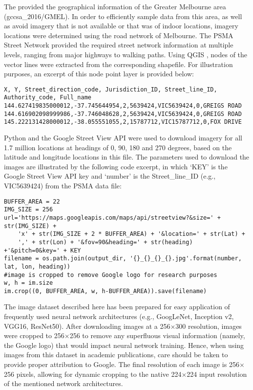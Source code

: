 \documentclass[final,3p,times,authoryear]{elsarticle}
\begin{document}
The \citet{Aurin2018} provided the geographical information of the Greater Melbourne area (gccsa\_2016/GMEL). In order to efficiently sample data from this area, as well as avoid imagery that is not available or that was of indoor locations, imagery locations were determined using the road network of Melbourne. The PSMA Street Network \citep{PSMA2018} provided the required street network information at multiple levels, ranging from major highways to walking paths. Using QGIS \citep{QGIS2009}, nodes of the vector lines were extracted from the corresponding shapefile. For illustration purposes, an excerpt of this node point layer is provided below:

\begin{verbatim}
X, Y, Street_direction_code, Jurisdiction_ID, Street_line_ID, Authority_code, Full_name
144.627419835000012,-37.745644954,2,5639424,VIC5639424,0,GREIGS ROAD
144.616902098999986,-37.746048628,2,5639424,VIC5639424,0,GREIGS ROAD
145.222131428000012,-38.055551055,2,15787712,VIC15787712,0,FOX DRIVE
\end{verbatim}

Python and the Google Street View API \citep{GoogleMaps2017b} were used to download imagery for all 1.7 million locations at headings of 0, 90, 180 and 270 degrees, based on the latitude and longitude locations in this file. The parameters used to download the images are illustrated by the following code excerpt, in which `KEY' is the Google Street View API key and `number' is the Street\_line\_ID (e.g., VIC5639424) from the PSMA data file:

\begin{verbatim}
BUFFER_AREA = 22
IMG_SIZE = 256
url='https://maps.googleapis.com/maps/api/streetview?&size=' + str(IMG_SIZE) +
    'x' + str(IMG_SIZE + 2 * BUFFER_AREA) + '&location=' + str(Lat) +
    ',' + str(Lon) + '&fov=90&heading=' + str(heading) +'&pitch=0&key=' + KEY         
filename = os.path.join(output_dir, '{}_{}_{}_{}.jpg'.format(number, lat, lon, heading))
#image is cropped to remove Google logo for research purposes
w, h = im.size
im.crop((0, BUFFER_AREA, w, h-BUFFER_AREA)).save(filename)
\end{verbatim}

The image dataset described here has been prepared for easy application of frequently used neural network architectures (e.g., GoogLeNet, Inception v2, VGG16, ResNet50). After downloading images at a 256$\times$300 resolution, images were cropped to 256$\times$256 to remove any superfluous visual information (namely, the Google logo) that would impact neural network training. Hence, when using images from this dataset in academic publications, care should be taken to provide proper attribution to Google. The final resolution of each image is 256$\times$256 pixels, allowing for dynamic cropping to the native 224$\times$224 input resolution of the mentioned network architectures.
\end{document}
